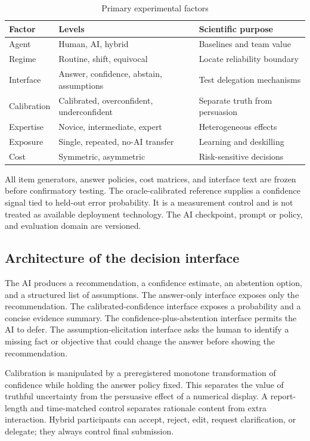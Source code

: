 \documentclass[conference]{IEEEtran}
\begin{document}
\begin{table}[t]
\caption{Primary experimental factors}
\label{tab:factors}
\centering
\scriptsize
\begin{tabular}{p{}p{}p{}}
\toprule
Factor & Levels & Scientific purpose \\
\midrule
Agent & Human, AI, hybrid & Baselines and team value \\
Regime & Routine, shift, equivocal & Locate reliability boundary \\
Interface & Answer, confidence, abstain, assumptions & Test delegation mechanisms \\
Calibration & Calibrated, overconfident, underconfident & Separate truth from persuasion \\
Expertise & Novice, intermediate, expert & Heterogeneous effects \\
Exposure & Single, repeated, no-AI transfer & Learning and deskilling \\
Cost & Symmetric, asymmetric & Risk-sensitive decisions \\
\bottomrule
\end{tabular}
\end{table}

All item generators, answer policies, cost matrices, and interface text are frozen before confirmatory testing. The oracle-calibrated reference supplies a confidence signal tied to held-out error probability. It is a measurement control and is not treated as available deployment technology. The AI checkpoint, prompt or policy, and evaluation domain are versioned.

\subsection{Architecture of the decision interface}

The AI produces a recommendation, a confidence estimate, an abstention option, and a structured list of assumptions. The answer-only interface exposes only the recommendation. The calibrated-confidence interface exposes a probability and a concise evidence summary. The confidence-plus-abstention interface permits the AI to defer. The assumption-elicitation interface asks the human to identify a missing fact or objective that could change the answer before showing the recommendation.

Calibration is manipulated by a preregistered monotone transformation of confidence while holding the answer policy fixed. This separates the value of truthful uncertainty from the persuasive effect of a numerical display. A report-length and time-matched control separates rationale content from extra interaction. Hybrid participants can accept, reject, edit, request clarification, or delegate; they always control final submission.
\end{document}
